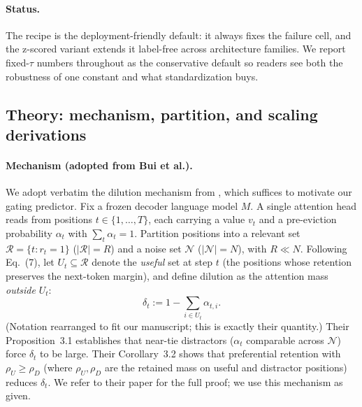 \documentclass{article}
\begin{document}
\paragraph{Status.} The recipe is the deployment-friendly default: it always
fixes the failure cell, and the z-scored variant extends it label-free
across architecture families. We report fixed-$\tau$ numbers throughout as
the conservative default so readers see both the robustness of one
constant and what standardization buys.

\subsection{Theory: mechanism, partition, and scaling derivations}

\paragraph{Mechanism (adopted from Bui et al.).}
We adopt verbatim the dilution mechanism from \citet{arxiv260509649}, which
suffices to motivate our gating predictor. Fix a frozen decoder language
model $M$. A single
attention head reads from positions $t \in \{1, \dots, T\}$, each carrying
a value $v_t$ and a pre-eviction probability $\alpha_t$ with $\sum_t
\alpha_t = 1$. Partition positions into a relevant set $\mathcal{R} = \{t:
r_t = 1\}$ ($|\mathcal{R}| = R$) and a noise set $\mathcal{N}$
($|\mathcal{N}| = N$), with $R \ll N$. Following \citet{arxiv260509649}
Eq.~(7), let $U_t \subseteq \mathcal{R}$ denote the \emph{useful} set at
step $t$ (the positions whose retention preserves the next-token margin),
and define dilution as the attention mass \emph{outside} $U_t$:
\begin{equation}
\label{eq:dilution}
\delta_t := 1 - \sum_{i \in U_t} \alpha_{t,i}.
\end{equation}
(Notation rearranged to fit our manuscript; this is exactly their
quantity.) Their Proposition~3.1 establishes that near-tie distractors
($\alpha_t$ comparable across $\mathcal{N}$) force $\delta_t$ to be large.
Their Corollary~3.2 shows that preferential retention with $\rho_U \geq
\rho_D$ (where $\rho_U, \rho_D$ are the retained mass on useful and
distractor positions) reduces $\delta_t$. We refer to their paper for the
full proof; we use this mechanism as given.
\end{document}
